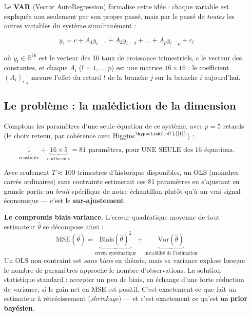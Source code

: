 \documentclass[11pt,a4paper]{article}
\newcommand{\cit}[1]{\textsuperscript{\hyperlink{ref#1}{[#1]}}}
\begin{document}
Le \textbf{VAR} (Vector AutoRegression) formalise cette idée : chaque variable est expliquée non seulement par son propre passé, mais par le passé de \emph{toutes} les autres variables du système simultanément :

\begin{equation}
y_t = c + A_1 y_{t-1} + A_2 y_{t-2} + \dots + A_p y_{t-p} + \varepsilon_t
\label{eq:var}
\end{equation}

où $y_t \in \mathbb{R}^{16}$ est le vecteur des 16 taux de croissance trimestriels, $c$ le vecteur des constantes, et chaque $A_l$ ($l=1,\dots,p$) est une matrice $16\times16$ : le coefficient $(A_l)_{i,j}$ mesure l'effet du retard $l$ de la branche $j$ sur la branche $i$ aujourd'hui.

\subsection{Le problème : la malédiction de la dimension}

Comptons les paramètres d'une seule équation de ce système, avec $p=5$ retards (le choix retenu, par cohérence avec Higgins$\cit{1}$) :

\begin{equation}
\underbrace{1}_{\text{constante}} + \underbrace{16 \times 5}_{\text{coefficients}} = 81 \text{ paramètres, pour UNE SEULE des 16 équations.}
\end{equation}

Avec seulement $T\approx 100$ trimestres d'historique disponibles, un OLS (moindres carrés ordinaires) sans contrainte estimerait ces 81 paramètres en s'ajustant en grande partie au \emph{bruit} spécifique de notre échantillon plutôt qu'à un vrai signal économique --- c'est le \textbf{sur-ajustement}.

\begin{definitionbox}
\textbf{Le compromis biais-variance.} L'erreur quadratique moyenne de tout estimateur $\hat\theta$ se décompose ainsi :
\[
\text{MSE}(\hat\theta) = \underbrace{\text{Biais}(\hat\theta)^2}_{\text{erreur systématique}} + \underbrace{\text{Var}(\hat\theta)}_{\text{instabilité de l'estimation}}
\]
Un OLS non contraint est \emph{sans biais} en théorie, mais sa variance explose lorsque le nombre de paramètres approche le nombre d'observations. La solution statistique standard : accepter un peu de biais, en échange d'une forte réduction de variance, si le gain net en MSE est positif. C'est exactement ce que fait un estimateur à rétrécissement (\emph{shrinkage}) --- et c'est exactement ce qu'est un \textbf{prior bayésien}.
\end{definitionbox}
\end{document}
